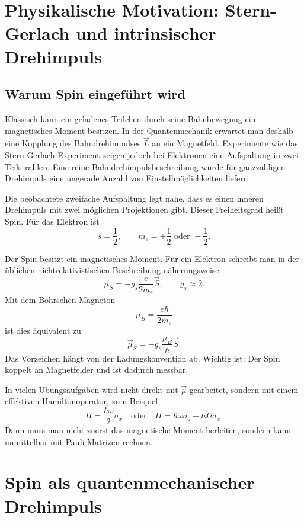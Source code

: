 \section{Physikalische Motivation: Stern-Gerlach und intrinsischer Drehimpuls}

\subsection{Warum Spin eingeführt wird}

Klassisch kann ein geladenes Teilchen durch seine Bahnbewegung ein magnetisches Moment besitzen. In der Quantenmechanik erwartet man deshalb eine Kopplung des Bahndrehimpulses \(\vec L\) an ein Magnetfeld. Experimente wie das Stern-Gerlach-Experiment zeigen jedoch bei Elektronen eine Aufspaltung in zwei Teilstrahlen. Eine reine Bahndrehimpulsbeschreibung würde für ganzzahligen Drehimpuls eine ungerade Anzahl von Einstellmöglichkeiten liefern.

\begin{conceptbox}
Die beobachtete zweifache Aufspaltung legt nahe, dass es einen inneren Drehimpuls mit zwei möglichen Projektionen gibt. Dieser Freiheitsgrad heißt Spin. Für das Elektron ist
\[
    s=\frac12,
    \qquad m_s=+\frac12 \text{ oder } -\frac12.
\]
\end{conceptbox}

Der Spin besitzt ein magnetisches Moment. Für ein Elektron schreibt man in der üblichen nichtrelativistischen Beschreibung näherungsweise
\[
    \vec\mu_S = -g_s\frac{e}{2m_e}\vec S,
    \qquad g_s\approx 2.
\]
Mit dem Bohrschen Magneton
\[
    \mu_B = \frac{e\hbar}{2m_e}
\]
ist dies äquivalent zu
\[
    \vec\mu_S = -g_s\frac{\mu_B}{\hbar}\vec S.
\]
Das Vorzeichen hängt von der Ladungskonvention ab. Wichtig ist: Der Spin koppelt an Magnetfelder und ist dadurch messbar.

\begin{notebox}
In vielen Übungsaufgaben wird nicht direkt mit \(\vec\mu\) gearbeitet, sondern mit einem effektiven Hamiltonoperator, zum Beispiel
\[
    H=\frac{\hbar\omega}{2}\sigma_x
    \quad \text{oder} \quad
    H=\hbar\omega\sigma_z+\hbar\Omega\sigma_x.
\]
Dann muss man nicht zuerst das magnetische Moment herleiten, sondern kann unmittelbar mit Pauli-Matrizen rechnen.
\end{notebox}

\section{Spin als quantenmechanischer Drehimpuls}

